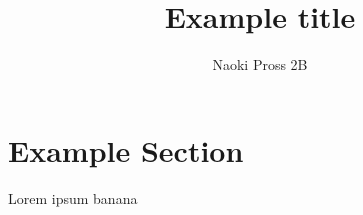 \documentclass[a4paper]{IEEEtran}
\begin{document}
	\author{Naoki Pross 2B}
	\title{Example title}
	\maketitle
	
	\section{Example Section}
	Lorem ipsum banana
	
\end{document}
